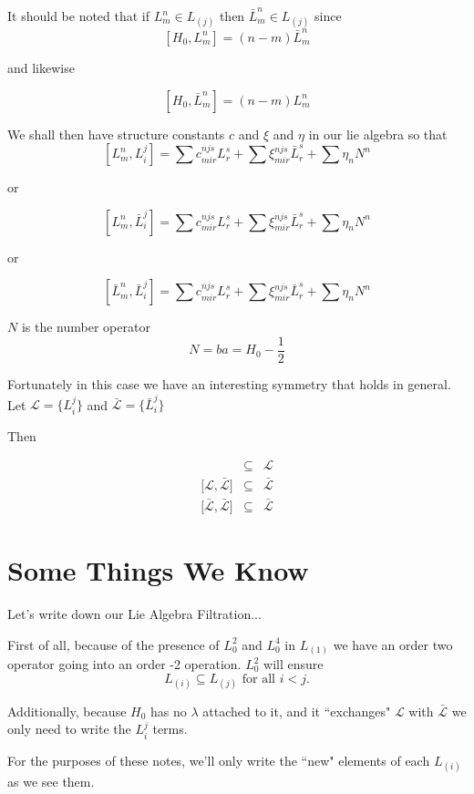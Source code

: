 \documentclass{article}
\begin{document}
It should be noted that if $L_m^n \in L_{(j)}$ then $\bar{L}_m^n \in  L_{(j)}$ since
\[
[H_0, L_m^n] = (n-m) \bar{L}_m^n
\]

and likewise

\[
[H_0, \bar{L}_m^n] = (n-m) {L}_m^n
\]

We shall then have structure constants $c$ and $\xi$ and $\eta$ in our lie algebra so that
\[
[L_m^n,L_i^j] = \sum c_{mir}^{njs} L_r^s + \sum \xi_{mir}^{njs} \bar{L}_r^s + \sum \eta_n N^n
\]

or

\[
[L_m^n,\bar{L}_i^j] = \sum c_{mir}^{njs} L_r^s + \sum \xi_{mir}^{njs} \bar{L}_r^s + \sum \eta_n N^n
\]

or

\[
[\bar{L}_m^n,\bar{L}_i^j] = \sum c_{mir}^{njs} L_r^s + \sum \xi_{mir}^{njs} \bar{L}_r^s + \sum \eta_n N^n
\]

$N$ is the number operator
\[
N = ba = H_0 -\frac{1}{2}
\]



Fortunately in this case we have an interesting symmetry that holds in general. Let $\mathcal{L} = \{ L_i^j\}$ and $\bar{\mathcal{L}} = \{ \bar{L}_i^j \}$ 

Then 

\begin{eqnarray*}
[\mathcal{L},\mathcal{L}] & \subseteq & \mathcal{L}\\
\lbrack \mathcal{L},\bar{\mathcal{L}} \rbrack & \subseteq & \bar{\mathcal{L}}\\
\lbrack \bar{\mathcal{L}},\bar{\mathcal{L}} \rbrack & \subseteq & \bar{\mathcal{L}}
\end{eqnarray*}

\section*{Some Things We Know}

Let's write down our Lie Algebra Filtration...

First of all, because of the presence of $L_0^2$ and $L_0^4$ in $L_{(1)}$ we have an order two operator going into an order -2 operation.  $L_0^2$ will ensure
\[
L_{(i)} \subseteq L_{(j)} \textrm{ for all } i<j.
\]

Additionally, because $H_0$ has no $\lambda$ attached to it, and it ``exchanges" $\mathcal{L}$ with $\bar{\mathcal{L}}$ we only need to write the $L_i^j$ terms.


For the purposes of these notes, we'll only write the ``new" elements of each $L_{(i)}$ as we see them.
\end{document}
